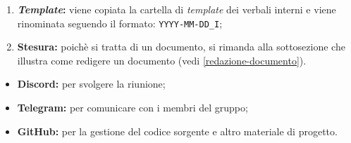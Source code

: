 \begin{itemize}
\begin{enumerate}
		      \item \textbf{\textit{Template}:} viene copiata la cartella di \textit{template} dei
		            verbali interni e viene rinominata
		            seguendo il formato: \texttt{YYYY-MM-DD\_I};

		      \item \textbf{Stesura:} poichè si tratta di un documento, si
		            rimanda alla sottosezione che illustra come redigere un
		            documento (vedi \cref{redazione-documento}).
	      \end{enumerate}
\end{itemize}

\begin{itemize}
	\item \textbf{Discord\g:} per svolgere la riunione;
	\item \textbf{Telegram\g:} per comunicare con i membri del gruppo;
	\item \textbf{GitHub\g:} per la gestione del codice sorgente e altro
	      materiale di progetto.
\end{itemize}

